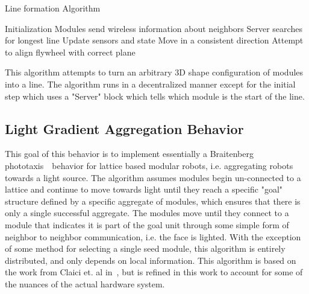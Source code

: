 \setcounter{algorithm}{0}
\begin{algorithm}[ht] 
	\caption{Line formation Algorithm}
	\label{algorithmLine}
	\SetAlgoLined
	Initialization\;
	{
		Modules send wireless information about neighbors\;
		Server searches for longest line\;
	}
	{
		Update sensors and state\;
		{
			Move in a consistent direction \;
		}
		{
			Attempt to align flywheel with correct plane\;
		}
	}
	\caption{This algorithm attempts to turn an arbitrary 3D shape configuration of modules into a line. The algorithm runs in a decentralized manner except for the initial step which uses a "Server" block which tells which module is the start of the line. }
\end{algorithm}




\subsection{Light Gradient Aggregation Behavior}
\label{sec:algLight}
This goal of this behavior is to implement essentially a Braitenberg phototaxis~\ behavior for lattice based modular robots, i.e. aggregating robots towards a light source. The algorithm assumes modules begin un-connected to a lattice and continue to move towards light until they reach a specific "goal" structure defined by a specific aggregate of modules, which ensures that there is only a single successful aggregate. The modules move until they connect to a module that indicates it is part of the goal unit through some simple form of neighbor to neighbor communication, i.e. the face is lighted. With the exception of some method for selecting a single seed module, this algorithm is entirely distributed, and only depends on local information. This algorithm is based on the work from Claici et. al in~\cite{claici2017distributed}, but is refined in this work to account for some of the nuances of the actual hardware system.


